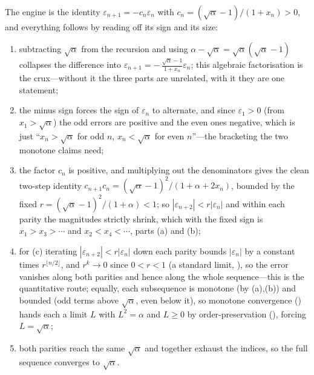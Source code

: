 \documentclass[main.tex]{subfiles}
\begin{document}
\begin{Reflection}
The engine is the identity $\varepsilon_{n+1}=-c_{n}\varepsilon_{n}$ with $c_{n}=(\sqrt\alpha-1)/(1+x_{n})>0$,
and everything follows by reading off its sign and its size:
\begin{enumerate}[leftmargin=1.7em,itemsep=3pt,topsep=2pt,label=\textnormal{(\arabic*)}]
  \item subtracting $\sqrt\alpha$ from the recursion and using $\alpha-\sqrt\alpha=\sqrt\alpha(\sqrt\alpha-1)$
        collapses the difference into $\varepsilon_{n+1}=-\,\frac{\sqrt\alpha-1}{1+x_{n}}\varepsilon_{n}$;
        this algebraic factorisation is the crux---without it the three parts are unrelated, with it they
        are one statement;
  \item the minus sign forces the sign of $\varepsilon_{n}$ to alternate, and since $\varepsilon_{1}>0$
        (from $x_{1}>\sqrt\alpha$) the odd errors are positive and the even ones negative, which is just
        ``$x_{n}>\sqrt\alpha$ for odd $n$, $x_{n}<\sqrt\alpha$ for even $n$''---the bracketing the two
        monotone claims need;
  \item the factor $c_{n}$ is positive, and multiplying out the denominators gives the clean two-step
        identity $c_{n+1}c_{n}=(\sqrt\alpha-1)^{2}/(1+\alpha+2x_{n})$, bounded by the fixed
        $r=(\sqrt\alpha-1)^{2}/(1+\alpha)<1$; so $|\varepsilon_{n+2}|<r|\varepsilon_{n}|$ and within each
        parity the magnitudes strictly shrink, which with the fixed sign is $x_{1}>x_{3}>\cdots$ and
        $x_{2}<x_{4}<\cdots$, parts (a) and (b);
  \item for (c) iterating $|\varepsilon_{n+2}|<r|\varepsilon_{n}|$ down each parity bounds
        $|\varepsilon_{n}|$ by a constant times $r^{\lfloor n/2\rfloor}$,
        and $r^{k}\to0$ since $0<r<1$ (a standard limit, ), so the error vanishes along both
        parities and hence along the whole sequence---this is the quantitative route; equally, each
        subsequence is monotone (by (a),(b)) and bounded (odd terms above $\sqrt\alpha$, even below it),
        so monotone convergence () hands each a limit $L$ with $L^{2}=\alpha$ and $L\ge0$ by
        order-preservation (), forcing $L=\sqrt\alpha$;
  \item both parities reach the same $\sqrt\alpha$ and together exhaust the indices, so the full
        sequence converges to $\sqrt\alpha$.
\end{enumerate}


\end{Reflection}
\end{document}
